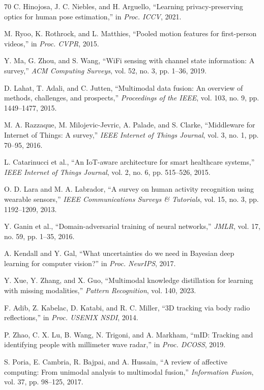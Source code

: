 \documentclass[journal]{IEEEtran}
\begin{document}
\begin{thebibliography}{70}
C. Hinojosa, J. C. Niebles, and H. Arguello, ``Learning privacy-preserving optics for human pose estimation,'' in \emph{Proc. ICCV}, 2021.

M. Ryoo, K. Rothrock, and L. Matthies, ``Pooled motion features for first-person videos,'' in \emph{Proc. CVPR}, 2015.

Y. Ma, G. Zhou, and S. Wang, ``WiFi sensing with channel state information: A survey,'' \emph{ACM Computing Surveys}, vol. 52, no. 3, pp. 1--36, 2019.

D. Lahat, T. Adali, and C. Jutten, ``Multimodal data fusion: An overview of methods, challenges, and prospects,'' \emph{Proceedings of the IEEE}, vol. 103, no. 9, pp. 1449--1477, 2015.

M. A. Razzaque, M. Milojevic-Jevric, A. Palade, and S. Clarke, ``Middleware for Internet of Things: A survey,'' \emph{IEEE Internet of Things Journal}, vol. 3, no. 1, pp. 70--95, 2016.

L. Catarinucci et al., ``An IoT-aware architecture for smart healthcare systems,'' \emph{IEEE Internet of Things Journal}, vol. 2, no. 6, pp. 515--526, 2015.

O. D. Lara and M. A. Labrador, ``A survey on human activity recognition using wearable sensors,'' \emph{IEEE Communications Surveys \& Tutorials}, vol. 15, no. 3, pp. 1192--1209, 2013.

Y. Ganin et al., ``Domain-adversarial training of neural networks,'' \emph{JMLR}, vol. 17, no. 59, pp. 1--35, 2016.

A. Kendall and Y. Gal, ``What uncertainties do we need in Bayesian deep learning for computer vision?'' in \emph{Proc. NeurIPS}, 2017.

Y. Xue, Y. Zhang, and X. Guo, ``Multimodal knowledge distillation for learning with missing modalities,'' \emph{Pattern Recognition}, vol. 140, 2023.

F. Adib, Z. Kabelac, D. Katabi, and R. C. Miller, ``3D tracking via body radio reflections,'' in \emph{Proc. USENIX NSDI}, 2014.

P. Zhao, C. X. Lu, B. Wang, N. Trigoni, and A. Markham, ``mID: Tracking and identifying people with millimeter wave radar,'' in \emph{Proc. DCOSS}, 2019.

S. Poria, E. Cambria, R. Bajpai, and A. Hussain, ``A review of affective computing: From unimodal analysis to multimodal fusion,'' \emph{Information Fusion}, vol. 37, pp. 98--125, 2017.


\end{thebibliography}
\end{document}
